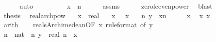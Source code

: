 \begin{isabellebody}
\ \ \ \ \isamarkupfalse%
\ auto\isanewline
\ \ \isamarkupfalse%
\ \isamarkupfalse%
\ {\isachardoublequoteopen}{\isachardot}{\kern0pt}{\isachardot}{\kern0pt}{\isachardot}{\kern0pt}\ {\isasymle}\ {\isacharparenleft}{\kern0pt}{}\ {\isacharplus}{\kern0pt}\ x{\isacharparenright}{\kern0pt}\ {\isacharcircum}{\kern0pt}\ n{\isachardoublequoteclose}\isanewline
\ \ \ \ \isamarkupfalse%
\ assms\isanewline
\ \ \ \ \isamarkupfalse%
\ zero{\isacharunderscore}{\kern0pt}le{\isacharunderscore}{\kern0pt}even{\isacharunderscore}{\kern0pt}power\ \isamarkupfalse%
\ blast\isanewline
\ \ \isamarkupfalse%
\ \isamarkupfalse%
\ {\isacharquery}{\kern0pt}thesis\ \isacommand{{\isachardot}{\kern0pt}}\isamarkupfalse%
\isanewline
{}\isamarkupfalse%
%
\endisatagproof
{\isafoldproof}%
%
\isadelimproof
\isanewline
%
\endisadelimproof
\isanewline
{}\isamarkupfalse%
\ real{\isacharunderscore}{\kern0pt}arch{\isacharunderscore}{\kern0pt}pow{\isacharcolon}{\kern0pt}\isanewline
\ \ \ x\ {\isacharcolon}{\kern0pt}{\isacharcolon}{\kern0pt}\ real\isanewline
\ \ \ x{\isacharcolon}{\kern0pt}\ {\isachardoublequoteopen}{}\ {\isacharless}{\kern0pt}\ x{\isachardoublequoteclose}\isanewline
\ \ \ {\isachardoublequoteopen}{\isasymexists}n{\isachardot}{\kern0pt}\ y\ {\isacharless}{\kern0pt}\ x{\isacharcircum}{\kern0pt}n{\isachardoublequoteclose}\isanewline
%
\isadelimproof
%
\endisadelimproof
%
\isatagproof
{}\isamarkupfalse%
\ {\isacharminus}{\kern0pt}\isanewline
\ \ \isamarkupfalse%
\ x\ \isamarkupfalse%
\ x{}{\isacharcolon}{\kern0pt}\ {\isachardoublequoteopen}x\ {\isacharminus}{\kern0pt}\ {}\ {\isachargreater}{\kern0pt}\ {}{\isachardoublequoteclose}\isanewline
\ \ \ \ \isamarkupfalse%
\ arith\isanewline
\ \ \isamarkupfalse%
\ reals{\isacharunderscore}{\kern0pt}Archimedean{}{\isacharbrackleft}{\kern0pt}OF\ x{}{\isacharcomma}{\kern0pt}\ rule{\isacharunderscore}{\kern0pt}format{\isacharcomma}{\kern0pt}\ of\ y{\isacharbrackright}{\kern0pt}\isanewline
\ \ \isamarkupfalse%
\ n\ {\isacharcolon}{\kern0pt}{\isacharcolon}{\kern0pt}\ nat\ \ n{\isacharcolon}{\kern0pt}\ {\isachardoublequoteopen}y\ {\isacharless}{\kern0pt}\ real\ n\ {\isacharasterisk}{\kern0pt}\ {\isacharparenleft}{\kern0pt}x\ {\isacharminus}{\kern0pt}\ {}{\isacharparenright}{\kern0pt}{\isachardoublequoteclose}\ \isamarkupfalse%

\end{isabellebody}
